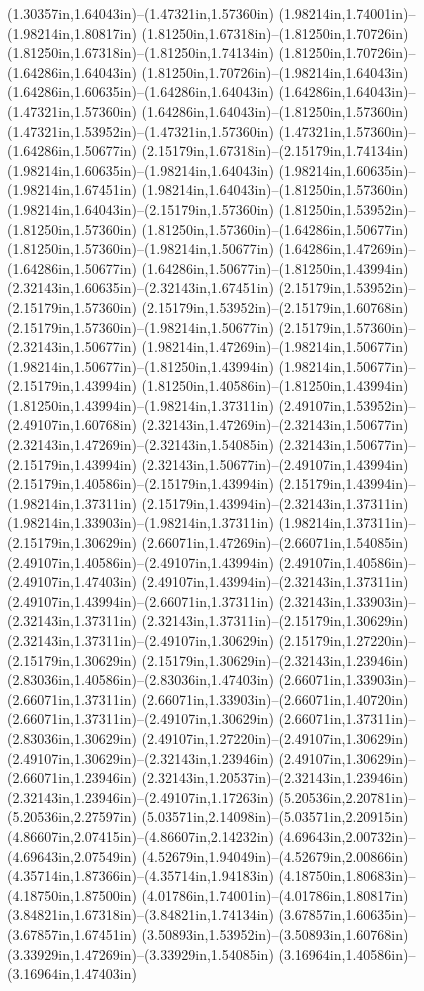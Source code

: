 (1.30357in,1.64043in)--(1.47321in,1.57360in) (1.98214in,1.74001in)--(1.98214in,1.80817in) (1.81250in,1.67318in)--(1.81250in,1.70726in) (1.81250in,1.67318in)--(1.81250in,1.74134in) (1.81250in,1.70726in)--(1.64286in,1.64043in) (1.81250in,1.70726in)--(1.98214in,1.64043in) (1.64286in,1.60635in)--(1.64286in,1.64043in) (1.64286in,1.64043in)--(1.47321in,1.57360in) (1.64286in,1.64043in)--(1.81250in,1.57360in) (1.47321in,1.53952in)--(1.47321in,1.57360in) (1.47321in,1.57360in)--(1.64286in,1.50677in) (2.15179in,1.67318in)--(2.15179in,1.74134in) (1.98214in,1.60635in)--(1.98214in,1.64043in) (1.98214in,1.60635in)--(1.98214in,1.67451in) (1.98214in,1.64043in)--(1.81250in,1.57360in) (1.98214in,1.64043in)--(2.15179in,1.57360in) (1.81250in,1.53952in)--(1.81250in,1.57360in) (1.81250in,1.57360in)--(1.64286in,1.50677in) (1.81250in,1.57360in)--(1.98214in,1.50677in) (1.64286in,1.47269in)--(1.64286in,1.50677in) (1.64286in,1.50677in)--(1.81250in,1.43994in) (2.32143in,1.60635in)--(2.32143in,1.67451in) (2.15179in,1.53952in)--(2.15179in,1.57360in) (2.15179in,1.53952in)--(2.15179in,1.60768in) (2.15179in,1.57360in)--(1.98214in,1.50677in) (2.15179in,1.57360in)--(2.32143in,1.50677in) (1.98214in,1.47269in)--(1.98214in,1.50677in) (1.98214in,1.50677in)--(1.81250in,1.43994in) (1.98214in,1.50677in)--(2.15179in,1.43994in) (1.81250in,1.40586in)--(1.81250in,1.43994in) (1.81250in,1.43994in)--(1.98214in,1.37311in) (2.49107in,1.53952in)--(2.49107in,1.60768in) (2.32143in,1.47269in)--(2.32143in,1.50677in) (2.32143in,1.47269in)--(2.32143in,1.54085in) (2.32143in,1.50677in)--(2.15179in,1.43994in) (2.32143in,1.50677in)--(2.49107in,1.43994in) (2.15179in,1.40586in)--(2.15179in,1.43994in) (2.15179in,1.43994in)--(1.98214in,1.37311in) (2.15179in,1.43994in)--(2.32143in,1.37311in) (1.98214in,1.33903in)--(1.98214in,1.37311in) (1.98214in,1.37311in)--(2.15179in,1.30629in) (2.66071in,1.47269in)--(2.66071in,1.54085in) (2.49107in,1.40586in)--(2.49107in,1.43994in) (2.49107in,1.40586in)--(2.49107in,1.47403in) (2.49107in,1.43994in)--(2.32143in,1.37311in) (2.49107in,1.43994in)--(2.66071in,1.37311in) (2.32143in,1.33903in)--(2.32143in,1.37311in) (2.32143in,1.37311in)--(2.15179in,1.30629in) (2.32143in,1.37311in)--(2.49107in,1.30629in) (2.15179in,1.27220in)--(2.15179in,1.30629in) (2.15179in,1.30629in)--(2.32143in,1.23946in) (2.83036in,1.40586in)--(2.83036in,1.47403in) (2.66071in,1.33903in)--(2.66071in,1.37311in) (2.66071in,1.33903in)--(2.66071in,1.40720in) (2.66071in,1.37311in)--(2.49107in,1.30629in) (2.66071in,1.37311in)--(2.83036in,1.30629in) (2.49107in,1.27220in)--(2.49107in,1.30629in) (2.49107in,1.30629in)--(2.32143in,1.23946in) (2.49107in,1.30629in)--(2.66071in,1.23946in) (2.32143in,1.20537in)--(2.32143in,1.23946in) (2.32143in,1.23946in)--(2.49107in,1.17263in) (5.20536in,2.20781in)--(5.20536in,2.27597in) (5.03571in,2.14098in)--(5.03571in,2.20915in) (4.86607in,2.07415in)--(4.86607in,2.14232in) (4.69643in,2.00732in)--(4.69643in,2.07549in) (4.52679in,1.94049in)--(4.52679in,2.00866in) (4.35714in,1.87366in)--(4.35714in,1.94183in) (4.18750in,1.80683in)--(4.18750in,1.87500in) (4.01786in,1.74001in)--(4.01786in,1.80817in) (3.84821in,1.67318in)--(3.84821in,1.74134in) (3.67857in,1.60635in)--(3.67857in,1.67451in) (3.50893in,1.53952in)--(3.50893in,1.60768in) (3.33929in,1.47269in)--(3.33929in,1.54085in) (3.16964in,1.40586in)--(3.16964in,1.47403in) 